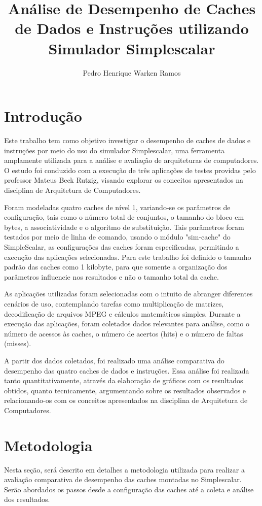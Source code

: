 \documentclass[12pt]{article}
\title{Análise de Desempenho de Caches de Dados e Instruções utilizando Simulador Simplescalar}
\author{Pedro Henrique Warken Ramos}
\begin{document}
 

\maketitle

\section{Introdução} \label{sec:introducao}

Este trabalho tem como objetivo investigar o desempenho de caches de dados e
instruções por meio do uso do simulador Simplescalar, uma ferramenta 
amplamente utilizada para a análise e avaliação de arquiteturas de 
computadores. O estudo foi conduzido com a execução de três aplicações de 
testes providas pelo professor Mateus Beck Rutzig, visando explorar os 
conceitos apresentados na disciplina de Arquitetura de Computadores.

Foram modeladas quatro caches de nível 1, variando-se os parâmetros de
configuração, tais como o número total de conjuntos, o 
tamanho do bloco em bytes, a associatividade e o algoritmo de substituição.
Tais parâmetros foram testados por meio de linha de comando, usando o módulo
"sim-cache" do SimpleScalar, as configurações das caches foram especificadas,
permitindo a execução das aplicações selecionadas. Para este trabalho foi
definido o tamanho padrão das caches como 1 kilobyte, para que somente a 
organização dos parâmetros influencie nos resultados e não o tamanho total da cache.

As aplicações utilizadas foram selecionadas com o intuito de abranger 
diferentes cenários de uso, contemplando tarefas como multiplicação de 
matrizes, decodificação de arquivos MPEG e cálculos matemáticos simples. 
Durante a execução das aplicações, foram coletados dados relevantes para 
análise, como o número de acessos às caches, o número de acertos (hits) e o número de faltas (misses).

A partir dos dados coletados, foi realizado uma análise comparativa do desempenho 
das quatro caches de dados e instruções. Essa análise foi realizada tanto 
quantitativamente, através da elaboração de gráficos com os resultados 
obtidos, quanto tecnicamente, argumentando sobre os resultados observados e 
relacionando-os com os conceitos apresentados na disciplina de Arquitetura de 
Computadores.

\section{Metodologia} \label{sec:metodologia}
Nesta seção, será descrito em detalhes a metodologia utilizada para realizar a avaliação comparativa de desempenho das caches montadas no Simplescalar. Serão abordados os passos desde a configuração das caches até a coleta e análise dos resultados.
\end{document}
